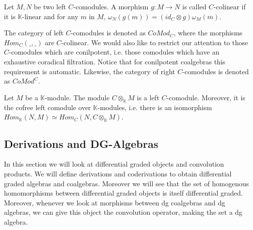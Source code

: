 \documentclass[../thesis.tex]{subfiles}
\begin{document}
\begin{definition}[Comodules]
\begin{center}
                \end{center}
            \end{definition}

            \begin{definition}
                Let $M,N$ be two left $C$-comodules. A morphism $g:M\rightarrow N$ is called $C$-colinear if it is $\mathbb{K}$-linear and for any $m$ in $M$, $\omega_N(g(m)) = (id_C\otimes g)\omega_M(m)$.
            \end{definition}

            The category of left $C$-comodules is denoted as $CoMod_C$, where the morphisms $Hom_C(\_,\_)$ are $C$-colinear. We would also like to restrict our attention to those $C$-comodules which are conilpotent, i.e. those comodules which have an exhaustive coradical filtration. Notice that for conilpotent coalgebras this requirement is automatic. Likewise, the category of right $C$-comodules is denoted as $CoMod^C$.

            \begin{proposition}
                Let $M$ be a $\mathbb{K}$-module. The module $C\otimes_{\mathbb{K}}M$ is a left $C$-comodule. Moreover, it is the cofree left comodule over $\mathbb{K}$-modules, i.e. there is an isomorphism $Hom_{\mathbb{K}}(N,M)\simeq Hom_C(N,C\otimes_{\mathbb{K}}M)$. 
            \end{proposition}

    \subsection{Derivations and DG-Algebras}
            In this section we will look at differential graded objects and convolution products. We will define derivations and coderivations to obtain differential graded algebras and coalgebras. Moreover we will see that the set of homogenous homomorphisms between differential graded objects is itself differential graded. Moreover, whenever we look at morphisms between dg coalgebras and dg algebras, we can give this object the convolution operator, making the set a dg algebra.
\end{document}
